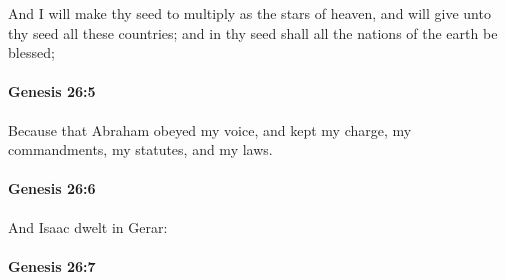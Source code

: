 			And I will make thy seed to multiply as the stars of heaven, and will give unto thy seed all these countries; and in thy seed shall all the nations of the earth be blessed;


		\paragraph{Genesis 26:5} %
			\label{GENESIS-26-5}

			Because that Abraham obeyed my voice, and kept my charge, my commandments, my statutes, and my laws.


		\paragraph{Genesis 26:6} %
			\label{GENESIS-26-6}

			And Isaac dwelt in Gerar:


		\paragraph{Genesis 26:7} %
			\label{GENESIS-26-7}

